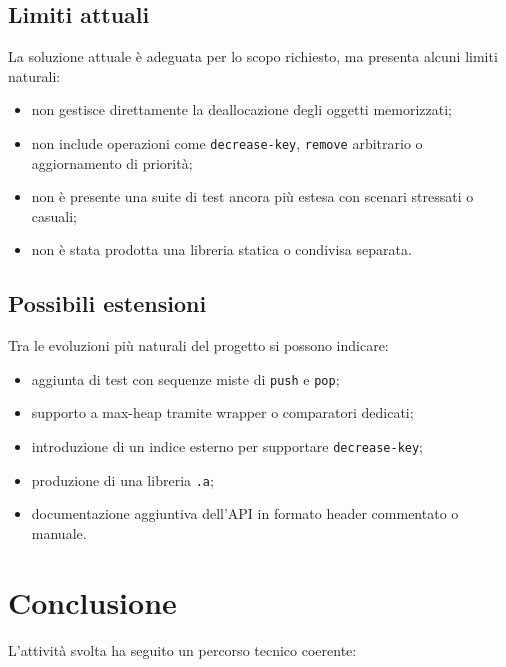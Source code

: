\documentclass[a4paper,12pt]{article}
\begin{document}
\subsection{Limiti attuali}

La soluzione attuale è adeguata per lo scopo richiesto, ma presenta alcuni limiti naturali:

\begin{itemize}[leftmargin=*]
    \item non gestisce direttamente la deallocazione degli oggetti memorizzati;
    \item non include operazioni come \texttt{decrease-key}, \texttt{remove} arbitrario o aggiornamento di priorità;
    \item non è presente una suite di test ancora più estesa con scenari stressati o casuali;
    \item non è stata prodotta una libreria statica o condivisa separata.
\end{itemize}

\subsection{Possibili estensioni}

Tra le evoluzioni più naturali del progetto si possono indicare:

\begin{itemize}[leftmargin=*]
    \item aggiunta di test con sequenze miste di \texttt{push} e \texttt{pop};
    \item supporto a max-heap tramite wrapper o comparatori dedicati;
    \item introduzione di un indice esterno per supportare \texttt{decrease-key};
    \item produzione di una libreria \texttt{.a};
    \item documentazione aggiuntiva dell'API in formato header commentato o manuale.
\end{itemize}

\section{Conclusione}

L'attività svolta ha seguito un percorso tecnico coerente:
\end{document}
